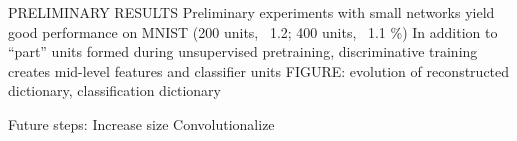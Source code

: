 PRELIMINARY RESULTS
Preliminary experiments with small networks yield good performance on MNIST (200 units, ~1.2; 400 units, ~1.1 \%)
In addition to ``part'' units formed during unsupervised pretraining, discriminative training  creates mid-level features and classifier units
FIGURE: evolution of reconstructed dictionary, classification dictionary

Future steps:
Increase size
Convolutionalize